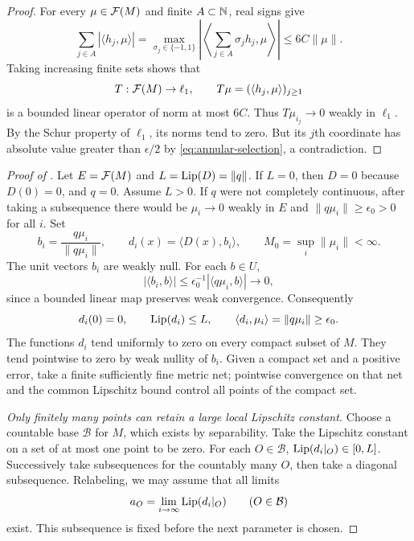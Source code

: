\begin{proof}
For every \(\mu\in\mathcal F(M)\) and finite \(A\subset\mathbb N\), real signs give
\[
 \sum_{j\in A}|\langle h_j,\mu\rangle|
 =\max_{\sigma_j\in\{-1,1\}}
   \left|\left\langle\sum_{j\in A}\sigma_jh_j,\mu\right\rangle\right|
 \le6C\|\mu\|.
\]
Taking increasing finite sets shows that
\[
 T:\mathcal F(M)\to\ell_1,\qquad T\mu=(\langle h_j,\mu\rangle)_{j\ge1}
\]
is a bounded linear operator of norm at most \(6C\).
Thus \(T\mu_{i_j}\to0\) weakly in \(\ell_1\). By the Schur property
of \(\ell_1\), its norms tend to zero.
But its \(j\)th coordinate has absolute value greater than
\(\epsilon/2\) by \eqref{eq:annular-selection}, a contradiction.
\end{proof}

\begin{proof}[Proof of ]
Let \(E=\mathcal F(M)\) and \(L=\operatorname{Lip}(D)=\|q\|\). If \(L=0\), then
\(D=0\) because \(D(0)=0\), and \(q=0\). Assume \(L>0\).
If \(q\) were not completely continuous, after taking a subsequence
there would be \(\mu_i\to0\) weakly in \(E\) and
\(\|q\mu_i\|\ge\epsilon_0>0\) for all \(i\). Set
\[
 b_i=\frac{q\mu_i}{\|q\mu_i\|},\qquad
 d_i(x)=\langle D(x),b_i\rangle,\qquad
 M_0=\sup_i\|\mu_i\|<\infty.
\]
The unit vectors \(b_i\) are weakly null. For each \(b\in U\),
\[
 |\langle b_i,b\rangle|
 \le\epsilon_0^{-1}|\langle q\mu_i,b\rangle|\longrightarrow0,
\]
since a bounded linear map preserves weak convergence. Consequently
\begin{equation}
\label{eq:scalar-tests}
 d_i(0)=0,\qquad \operatorname{Lip}(d_i)\le L,\qquad
 \langle d_i,\mu_i\rangle=\|q\mu_i\|\ge\epsilon_0.
\end{equation}
The functions \(d_i\) tend uniformly to zero on every compact subset
of \(M\). They tend pointwise to zero by weak nullity of \(b_i\).
Given a compact set and a positive error, take a finite sufficiently
fine metric net; pointwise convergence on that net and the common
Lipschitz bound control all points of the compact set.

\medskip
\noindent\emph{Only finitely many points can retain a large local
Lipschitz constant.}
Choose a countable base \(\mathcal B\) for \(M\), which exists by
separability. Take the Lipschitz constant on a set of at most one
point to be zero. For each \(O\in\mathcal B\),
\(\operatorname{Lip}(d_i|_O)\in[0,L]\). Successively take subsequences for the
countably many \(O\), then take a diagonal subsequence. Relabeling,
we may assume that all limits
\[
 a_O=\lim_{i\to\infty}\operatorname{Lip}(d_i|_O)
 \qquad(O\in\mathcal B)
\]
exist. This subsequence is fixed before the next parameter is chosen.


\end{proof}
